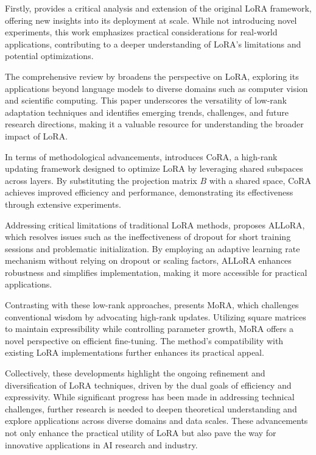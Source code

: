 \documentclass[conference]{IEEEtran}
\begin{document}
Firstly, \cite{b1} provides a critical analysis and extension of the original LoRA framework, offering new insights into its deployment at scale. While not introducing novel experiments, this work emphasizes practical considerations for real-world applications, contributing to a deeper understanding of LoRA's limitations and potential optimizations.

The comprehensive review by \cite{b2} broadens the perspective on LoRA, exploring its applications beyond language models to diverse domains such as computer vision and scientific computing. This paper underscores the versatility of low-rank adaptation techniques and identifies emerging trends, challenges, and future research directions, making it a valuable resource for understanding the broader impact of LoRA.

In terms of methodological advancements, \cite{b3} introduces CoRA, a high-rank updating framework designed to optimize LoRA by leveraging shared subspaces across layers. By substituting the projection matrix \( B \) with a shared space, CoRA achieves improved efficiency and performance, demonstrating its effectiveness through extensive experiments.

Addressing critical limitations of traditional LoRA methods, \cite{b4} proposes ALLoRA, which resolves issues such as the ineffectiveness of dropout for short training sessions and problematic initialization. By employing an adaptive learning rate mechanism without relying on dropout or scaling factors, ALLoRA enhances robustness and simplifies implementation, making it more accessible for practical applications.

Contrasting with these low-rank approaches, \cite{b5} presents MoRA, which challenges conventional wisdom by advocating high-rank updates. Utilizing square matrices to maintain expressibility while controlling parameter growth, MoRA offers a novel perspective on efficient fine-tuning. The method's compatibility with existing LoRA implementations further enhances its practical appeal.

Collectively, these developments highlight the ongoing refinement and diversification of LoRA techniques, driven by the dual goals of efficiency and expressivity. While significant progress has been made in addressing technical challenges, further research is needed to deepen theoretical understanding and explore applications across diverse domains and data scales. These advancements not only enhance the practical utility of LoRA but also pave the way for innovative applications in AI research and industry.
\end{document}
